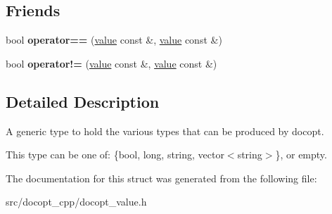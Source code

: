 \subsection*{Friends}
\begin{DoxyCompactItemize}
\item 
\mbox{\label{structdocopt_1_1value_a978098e745a3a42613ee4a31d6fc7a3d}} 
bool {\bfseries operator==} (\hyperlink{structdocopt_1_1value}{value} const \&, \hyperlink{structdocopt_1_1value}{value} const \&)
\item 
\mbox{\label{structdocopt_1_1value_a12dc6286941afe66b4a5666ef515b194}} 
bool {\bfseries operator!=} (\hyperlink{structdocopt_1_1value}{value} const \&, \hyperlink{structdocopt_1_1value}{value} const \&)
\end{DoxyCompactItemize}


\subsection{Detailed Description}
A generic type to hold the various types that can be produced by docopt.

This type can be one of\+: \{bool, long, string, vector$<$string$>$\}, or empty. 

The documentation for this struct was generated from the following file\+:\begin{DoxyCompactItemize}
\item 
src/docopt\+\_\+cpp/docopt\+\_\+value.\+h\end{DoxyCompactItemize}
